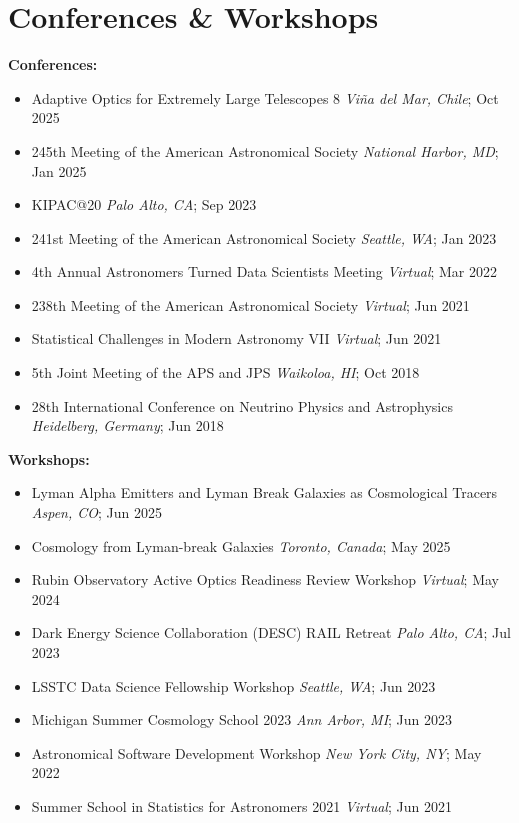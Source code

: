 \section{Conferences \& Workshops}

\textbf{Conferences:}
\begin{itemize}
    \item Adaptive Optics for Extremely Large Telescopes 8 \hfill \textit{Vi\~{n}a del Mar, Chile}; Oct 2025
    \item 245th Meeting of the American Astronomical Society \hfill \textit{National Harbor, MD}; Jan 2025
    \item KIPAC@20 \hfill \textit{Palo Alto, CA}; Sep 2023
    \item 241st Meeting of the American Astronomical Society \hfill \textit{Seattle, WA}; Jan 2023
    \item 4th Annual Astronomers Turned Data Scientists Meeting \hfill \textit{Virtual}; Mar 2022
    \item 238th Meeting of the American Astronomical Society \hfill \textit{Virtual}; Jun 2021
    \item Statistical Challenges in Modern Astronomy VII \hfill \textit{Virtual}; Jun 2021
    \item 5th Joint Meeting of the APS and JPS \hfill \textit{Waikoloa, HI}; Oct 2018
    \item 28th International Conference on Neutrino Physics and Astrophysics \hfill \textit{Heidelberg, Germany}; Jun 2018
\end{itemize}

\textbf{Workshops:}
\begin{itemize}
    \item Lyman Alpha Emitters and Lyman Break Galaxies as Cosmological Tracers \hfill \textit{Aspen, CO}; Jun 2025
    \item Cosmology from Lyman-break Galaxies \hfill \textit{Toronto, Canada}; May 2025
    \item Rubin Observatory Active Optics Readiness Review Workshop \hfill \textit{Virtual}; May 2024
    \item Dark Energy Science Collaboration (DESC) RAIL Retreat \hfill \textit{Palo Alto, CA}; Jul 2023
    \item LSSTC Data Science Fellowship Workshop \hfill \textit{Seattle, WA}; Jun 2023
    \item Michigan Summer Cosmology School 2023 \hfill \textit{Ann Arbor, MI}; Jun 2023
    \item Astronomical Software Development Workshop \hfill \textit{New York City, NY}; May 2022
    \item Summer School in Statistics for Astronomers 2021 \hfill \textit{Virtual}; Jun 2021
\end{itemize}


